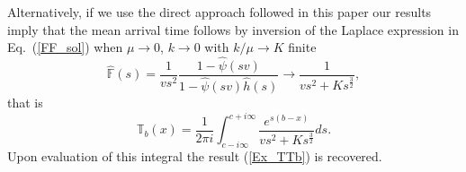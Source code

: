 \documentclass[english,aps,a4paper,twocolumn,showpacs,showkeys,amsfonts,amsmath,amssymb,amscd,nofootinbib]{revtex4}
\newcommand{\1}{\'\i}
\newcommand{\TT}{\mathbb{T}}\newcommand{\FF}{\mathbb{F}}
\begin{document}
Alternatively, if we use the direct approach followed in this paper our results imply that the mean arrival time follows by inversion of the Laplace expression in
Eq.~(\ref{FF_sol}) 
when $\mu \to 0$, $k \to 0$ with $k/\mu \to K$ finite
\begin{equation}
\hat{\FF}(s)=\frac{1}{v s^2}\frac{1-\hat{\psi}(s v)}{1-\hat{\psi}(s v)\hat{h}(s)} \rightarrow \frac{1}{vs^2 +Ks^{\frac{3}{2}}},%
\end{equation}
that is \begin{equation}
\TT_b(x)=\frac{1}{2\pi i}
\int_{c-i\infty}^{c+i\infty} \frac{e^{ s(b-x)} }{vs^2 +Ks^{\frac{3}{2}}} d s.
\end{equation}
Upon evaluation of this integral the result (\ref{Ex_TTb}) is recovered.
\end{document}
